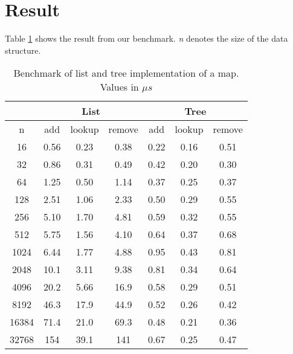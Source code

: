 \documentclass[a4paper,11pt]{article}
\begin{document}
\section*{Result}
Table \ref{table:bench} shows the result from our benchmark. \textit{n} denotes the size of the data structure.
\begin{table}[h]
    \centering
    \begin{tabular}{|c c|c|c|c|c|c|}
        \hline
              & \multicolumn{3}{c|}{List} & \multicolumn{3}{|c|}{Tree}                                   \\ \hline
        n     & add                       & lookup                     & remove & add  & lookup & remove \\ \hline
        16    & 0.56                      & 0.23                       & 0.38   & 0.22 & 0.16   & 0.51   \\
        32    & 0.86                      & 0.31                       & 0.49   & 0.42 & 0.20   & 0.30   \\
        64    & 1.25                      & 0.50                       & 1.14   & 0.37 & 0.25   & 0.37   \\
        128   & 2.51                      & 1.06                       & 2.33   & 0.50 & 0.29   & 0.55   \\
        256   & 5.10                      & 1.70                       & 4.81   & 0.59 & 0.32   & 0.55   \\
        512   & 5.75                      & 1.56                       & 4.10   & 0.64 & 0.37   & 0.68   \\
        1024  & 6.44                      & 1.77                       & 4.88   & 0.95 & 0.43   & 0.81   \\
        2048  & 10.1                      & 3.11                       & 9.38   & 0.81 & 0.34   & 0.64   \\
        4096  & 20.2                      & 5.66                       & 16.9   & 0.58 & 0.29   & 0.51   \\
        8192  & 46.3                      & 17.9                       & 44.9   & 0.52 & 0.26   & 0.42   \\
        16384 & 71.4                      & 21.0                       & 69.3   & 0.48 & 0.21   & 0.36   \\
        32768 & 154                       & 39.1                       & 141    & 0.67 & 0.25   & 0.47   \\ \hline
    \end{tabular}
    \caption{Benchmark of list and tree implementation of a map. \\Values in $\mu s$}
    \label{table:bench}
\end{table}
\end{document}
